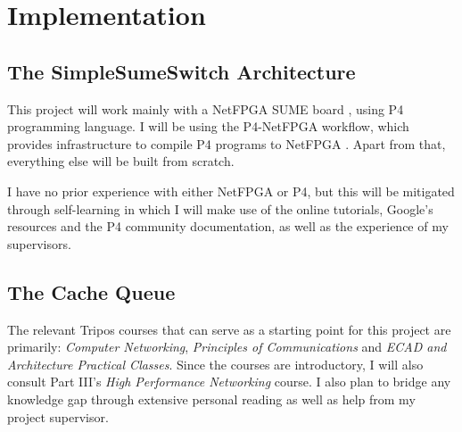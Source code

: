 \chapter{Implementation}

\section{The SimpleSumeSwitch Architecture}
This project will work mainly with a NetFPGA SUME board \cite{zilberman2014netfpga}, using P4 programming language. I will be using the P4-NetFPGA workflow, which provides infrastructure to compile P4 programs to NetFPGA \cite{fpga}. Apart from that, everything else will be built from scratch.

I have no prior experience with either NetFPGA or P4, but this will be mitigated through self-learning in which I will make use of the online tutorials, Google's resources and the P4 community documentation, as well as the experience of my supervisors. 

\section{The Cache Queue}
The relevant Tripos courses that can serve as a starting point for this project are primarily: \emph{Computer Networking}, \emph{Principles of Communications} and \emph{ECAD and Architecture Practical Classes}. Since the courses are introductory, I will also consult Part III's \emph{High Performance Networking} course. I also plan to bridge any knowledge gap through extensive personal reading as well as help from my project supervisor.
